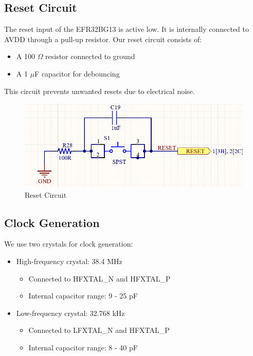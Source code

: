 \documentclass[a4paper,11pt]{article}%
\begin{document}
\subsection{Reset Circuit}

The reset input of the EFR32BG13 is active low. It is internally connected to AVDD through a pull-up resistor. Our reset circuit consists of:

\begin{itemize}
    \item A 100 $\Omega$ resistor connected to ground
    \item A 1 $\mu$F capacitor for debouncing
\end{itemize}

This circuit prevents unwanted resets due to electrical noise.

\begin{figure}[H]
    \centering
    \includegraphics[width=\textwidth]{figures/reset_circuit.png}
    \caption{Reset Circuit}
\end{figure}


\subsection{Clock Generation}

We use two crystals for clock generation:

\begin{itemize}
    \item High-frequency crystal: 38.4 MHz
    \begin{itemize}
        \item Connected to HFXTAL\_N and HFXTAL\_P
        \item Internal capacitor range: 9 - 25 pF
    \end{itemize}
    \item Low-frequency crystal: 32.768 kHz
    \begin{itemize}
        \item Connected to LFXTAL\_N and HFXTAL\_P
        \item Internal capacitor range: 8 - 40 pF
    \end{itemize}
\end{itemize}
\end{document}
